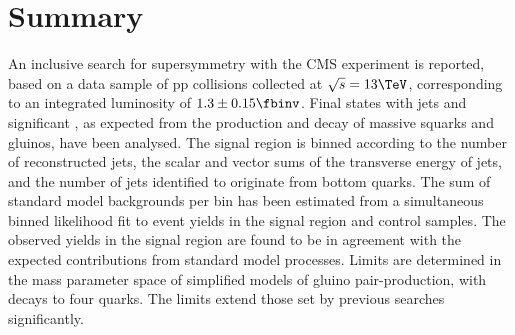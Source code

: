 \section{Summary}
\label{sec:summary}

An inclusive search for supersymmetry with the CMS experiment is
reported, based on a data sample of pp collisions collected at
$\sqrt{s} = 13\TeV$, corresponding to an integrated luminosity of 
$1.3 \pm 0.15 \fbinv$. Final states with jets and
significant \met, as expected from the production and decay of massive
squarks and gluinos, have been analysed.  The signal region is binned
according to the number of reconstructed jets, the scalar and vector sums of the
transverse energy of jets, and the number of jets identified to
originate from bottom quarks. The sum of standard model backgrounds
per bin has been estimated from a simultaneous binned likelihood fit
to event yields in the signal region and control samples. 
The observed yields in the signal region are found to be in agreement
with the expected contributions from standard model processes. Limits
are determined in the mass parameter space of simplified models of gluino pair-production, with decays to four quarks. 
The limits extend those set by previous searches significantly.


